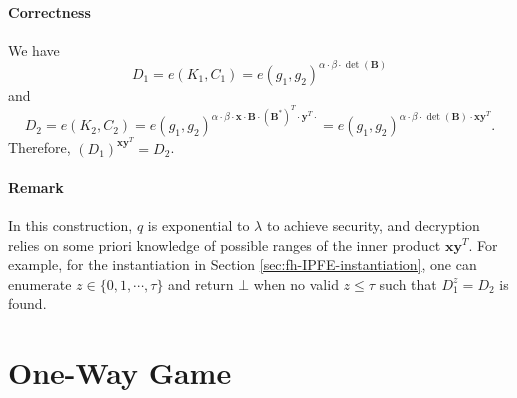 \paragraph{Correctness}
We have
\[
	D_1 = e(K_1, C_1) = e(g_1, g_2)^{\alpha \cdot \beta \cdot \det(\mathbf{B})}
\] and 
\[
	D_2 = e(K_2, C_2) = e(g_1, g_2)^{\alpha \cdot \beta \cdot \mathbf{x} \cdot \mathbf{B} \cdot (\mathbf{B}^*)^T \cdot \mathbf{y}^T \cdot } = e(g_1, g_2)^{\alpha \cdot \beta \cdot \det(\mathbf{B}) \cdot \mathbf{x}\mathbf{y}^T }.
\]
Therefore, $(D_1)^{\mathbf{x}\mathbf{y}^T} = D_2$.

\paragraph{Remark}
In this construction, $q$ is exponential to $\lambda$ to achieve security, and decryption relies on some priori knowledge of possible ranges of the inner product $\mathbf{x} \mathbf{y}^T$. For example, for the instantiation in Section \ref{sec:fh-IPFE-instantiation}, one can enumerate $z \in \{0, 1, \cdots, \tau \}$ and return $\bot$ when no valid $z \leq \tau$ such that $D_1^z = D_2$ is found.







\newpage


\section{One-Way Game}

